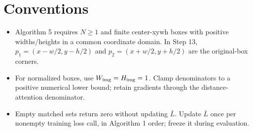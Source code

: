 \documentclass[10pt]{article}
\begin{document}
\section*{Conventions}
\begin{itemize}
\item Algorithm 5 requires $N\ge1$ and finite center-xywh boxes with positive widths/heights in a common coordinate domain. In Step 13, $p_1=(x-w/2,y-h/2)$ and $p_2=(x+w/2,y+h/2)$ are the original-box corners.
\item For normalized boxes, use $W_{\rm img}=H_{\rm img}=1$. Clamp denominators to a positive numerical lower bound; retain gradients through the distance-attention denominator.
\item Empty matched sets return zero without updating $\bar L$. Update $\bar L$ once per nonempty training loss call, in Algorithm 1 order; freeze it during evaluation.
\end{itemize}
\end{document}

